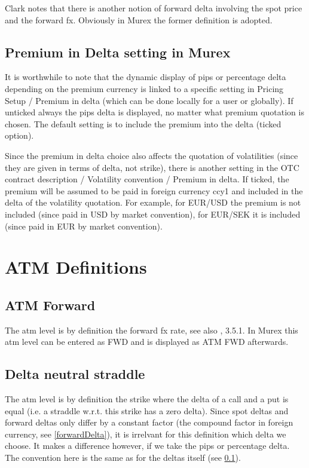\documentclass{amsart}
\theoremstyle{plain}
\numberwithin{equation}{section}
\begin{document}
Clark notes that there is another notion of forward delta involving the spot price and the forward
fx. Obviously in Murex the former definition is adopted.

\subsection{Premium in Delta setting in Murex}
\label{PremiumInDeltaMx}

It is worthwhile to note that the dynamic display of pips or percentage delta depending on the premium
currency is linked to a specific setting in Pricing Setup / Premium in delta (which can be done
locally for a user or globally). If unticked always the pips delta is displayed, no matter what premium
quotation is chosen. The default setting is to include the premium into the delta (ticked option).

Since the premium in delta choice also affects the quotation of volatilities (since they are given
in terms of delta, not strike), there is another setting in the OTC contract description / Volatility
convention / Premium in delta. If ticked, the premium will be assumed to be paid in foreign currency
ccy1 and included in the delta of the volatility quotation. For example, for EUR/USD the premium is not
included (since paid in USD by market convention), for EUR/SEK it is included (since paid in EUR by market
convention).

\section{ATM Definitions}
\label{atmdef}
\subsection{ATM Forward}

The atm level is by definition the forward fx rate, see also \cite{Clark}, 3.5.1. In Murex this atm level 
can be entered as FWD and is displayed as ATM FWD afterwards.

\subsection{Delta neutral straddle}

The atm level is by definition the strike where the delta of a call and a put is equal (i.e. a
straddle w.r.t. this strike has a zero delta). Since spot deltas and forward deltas only differ
by a constant factor (the compound factor in foreign currency, see \ref{forwardDelta}), it is
irrelvant for this definition which delta we choose. It makes a difference however, if we
take the pips or percentage delta. The convention here is the same as for the deltas itself
(see \ref{PremiumInDeltaMx}).
\end{document}
